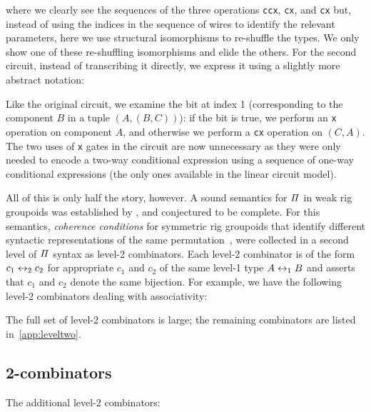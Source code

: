 \medskip

\adder{}

\addertwo{}

\noindent where we clearly see the sequences of the three operations \verb|ccx|, \verb|cx|, and \verb|cx| but, instead
of using the indices in the sequence of wires to identify the relevant parameters, here we use structural isomorphisms
to re-shuffle the types. We only show one of these re-shuffling isomorphisms and elide the others. For the second circuit, instead of transcribing it directly, we express it using
a slightly more abstract notation:

\medskip

\resettwo{}

\noindent Like the original circuit, we examine the bit at index 1 (corresponding to the component $B$ in a tuple
$(A,(B,C))$): if the bit is true, we perform an \verb|x| operation on component $A$, and otherwise we perform a
\verb|cx| operation on $(C,A)$. The two uses of \verb|x| gates in the circuit are now unnecessary as they were only needed
to encode a two-way conditional expression using a sequence of one-way conditional expressions (the only ones available in
the linear circuit model).

All of this is only half the story, however. A sound semantics for $\mathit{\Pi}$ in weak rig
groupoids was established by \citet{caretteComputingSemiringsWeak2016}, and conjectured to be complete. For this
semantics, \emph{coherence conditions} for symmetric rig groupoids that identify different syntactic representations of the same
permutation~\cite{laplaza72,caretteComputingSemiringsWeak2016}, were collected  in a
second level of $\mathit{\Pi}$ syntax as level-2 combinators.  Each level-2 combinator is of the form $c_1 \leftrightarrow_2 c_2$ for appropriate
$c_1$ and $c_2$ of the same level-1 type $A \leftrightarrow_1 B$ and asserts that $c_1$ and $c_2$ denote the same bijection. For
example, we have the following level-2 combinators dealing with associativity:

\medskip

\leveltwoblockone{}

\noindent The full set of level-2 combinators is large; the remaining combinators are listed in~\cref{app:leveltwo}.

\begin{toappendix}
  \subsection{2-combinators}

  The additional level-2 combinators:

  \label{app:leveltwo}

  \medskip
  \leveltwoblocktwo{}
\end{toappendix}

